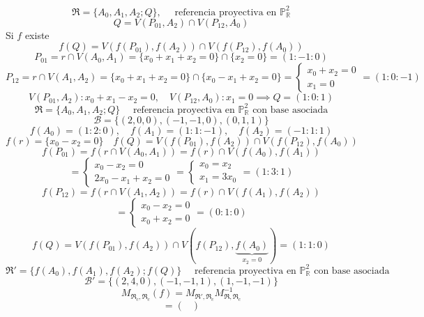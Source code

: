 {    \[
        \mathfrak{R} = \{ A_0, A_1, A_2; Q \}, \quad \text{ referencia proyectiva en } \mathbb{P}^2_{\mathbb{R}}
    \]
    \[
        Q = V(P_{01},A_2) \cap V(P_{12},A_0) 
    \]
    Si $f$ existe
    \[
        f(Q) = V(f(P_{01}),f(A_2)) \cap V(f(P_{12}),f(A_0)) 
    \]
    \[
        P_{01} = r \cap V(A_0,A_1) = \{x_0 + x_1 + x_2 = 0\} \cap \{x_2 = 0\} = (1:-1:0)
    \]
    \[
        P_{12} = r \cap V(A_1,A_2) = \{x_0 + x_1 + x_2 = 0\} \cap \{x_0 - x_1 + x_2 = 0\} = \begin{cases}
            x_0 + x_2 = 0 \\
            x_1 = 0
        \end{cases} = (1:0:-1)
    \]
    \[ 
        V(P_{01},A_2) : x_0 + x_1 - x_2 = 0, \quad V(P_{12},A_0) : x_1 = 0  \implies Q = (1:0:1)
    \]
    \[
        \mathfrak{R} = \{ A_0, A_1, A_2; Q \} \quad \text{ referencia proyectiva en } \mathbb{P}^2_{\mathbb{R}} \text{ con base asociada}
    \]
    \[
        \mathcal{B} = \{(2,0,0),(-1,-1,0),(0,1,1)\}
    \]
    \[
        f(A_0) = (1:2:0), \quad f(A_1) = (1:1:-1), \quad f(A_2) = (-1:1:1)
    \]
    \[
        f(r) = \{x_0 - x_2 = 0\} \quad f(Q) = V(f(P_{01}),f(A_2)) \cap V(f(P_{12}),f(A_0))
    \]
    \[
        f(P_{01}) = f(r \cap V(A_0,A_1)) = f(r) \cap V(f(A_0),f(A_1)) 
    \] 
    \[
    = \begin{cases}
            x_0 - x_2 = 0 \\
            2x_0 - x_1 + x_2 = 0
        \end{cases} = \begin{cases}
            x_0 = x_2 \\
            x_1 = 3x_0
        \end{cases} = (1:3:1)
    \]
    \[
        f(P_{12}) = f(r \cap V(A_1,A_2)) = f(r) \cap V(f(A_1),f(A_2))
    \]
    \[
        = \begin{cases}
            x_0 - x_2 = 0 \\
            x_0 + x_2 = 0
        \end{cases} = (0:1:0)            
    \]
    \[
        f(Q) = V(f(P_{01}),f(A_2)) \cap V(f(P_{12}),\underbrace{f(A_0)}_{x_2=0}) = (1:1:0)
    \]
    \[
        \mathfrak{R}' = \{ f(A_0), f(A_1), f(A_2); f(Q) \} \quad \text{ referencia proyectiva en } \mathbb{P}^2_{\mathbb{R}} \text{ con base asociada}
    \]
    \[
        \mathcal{B}' = \{(2,4,0),(-1,-1,1),(1,-1,-1)\}
    \]
    \[
        M_{\mathfrak{R}_c,\mathfrak{R}_c}(f) = M_{\mathfrak{R}',\mathfrak{R}_c}M_{\mathfrak{R},\mathfrak{R}_c}^{-1} 
    \]
    \[
        = \begin{pmatrix}

\end{pmatrix}\]}
